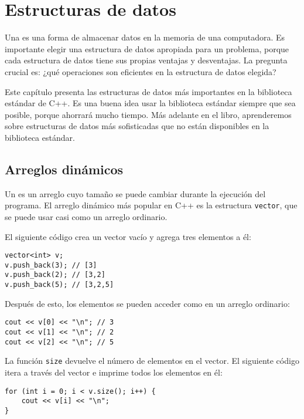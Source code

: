 \chapter{Estructuras de datos}


Una  es una forma de almacenar
datos en la memoria de una computadora.
Es importante elegir una estructura de datos apropiada
para un problema,
porque cada estructura de datos tiene sus propias
ventajas y desventajas.
La pregunta crucial es: ¿qué operaciones
son eficientes en la estructura de datos elegida?

Este capítulo presenta las estructuras de datos más importantes
en la biblioteca estándar de C++.
Es una buena idea usar la biblioteca estándar
siempre que sea posible,
porque ahorrará mucho tiempo.
Más adelante en el libro, aprenderemos sobre estructuras de datos más sofisticadas
que no están disponibles
en la biblioteca estándar.

\section{Arreglos dinámicos}


Un  es un arreglo cuyo
tamaño se puede cambiar durante la ejecución
del programa.
El arreglo dinámico más popular en C++ es
la estructura \texttt{vector},
que se puede usar casi como un arreglo ordinario.

El siguiente código crea un vector vacío y
agrega tres elementos a él:

\begin{lstlisting}
vector<int> v;
v.push_back(3); // [3]
v.push_back(2); // [3,2]
v.push_back(5); // [3,2,5]
\end{lstlisting}

Después de esto, los elementos se pueden acceder como en un arreglo ordinario:

\begin{lstlisting}
cout << v[0] << "\n"; // 3
cout << v[1] << "\n"; // 2
cout << v[2] << "\n"; // 5
\end{lstlisting}

La función \texttt{size} devuelve el número de elementos en el vector.
El siguiente código itera a través
del vector e imprime todos los elementos en él:

\begin{lstlisting}
for (int i = 0; i < v.size(); i++) {
    cout << v[i] << "\n";
}
\end{lstlisting}

